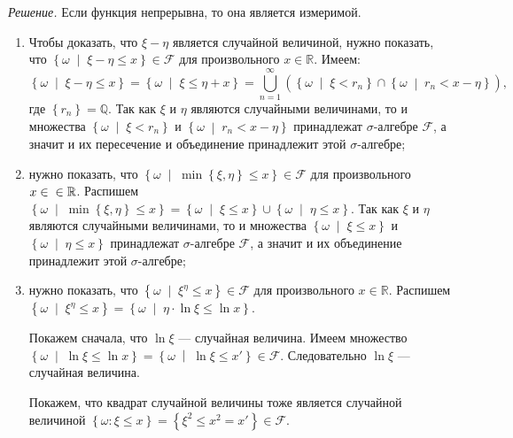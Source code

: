 \textit{Решение.} Если функция непрерывна, то она является измеримой.

\begin{enumerate}[label=\alph*)]
\item
Чтобы доказать, что $ \xi - \eta $ является случайной величиной,
нужно показать, что $ \left\{ \omega \; \middle| \; \xi - \eta \leq x \right\} \in \mathcal{F} $ для произвольного $x \in \mathbb{R} $.
Имеем:
$$ \left\{ \omega \; \middle| \; \xi - \eta \leq x \right\} =
\left\{ \omega \; \middle| \; \xi \leq \eta + x \right\} =
\bigcup \limits_{n=1}^{ \infty } \left( \left\{ \omega \; \middle| \; \xi < r_n \right\} \cap
\left\{ \omega \; \middle| \; r_n < x - \eta \right\} \right),$$
где $ \left\{ r_n \right\} = \mathbb{Q} $.
Так как $ \xi $ и $ \eta $ являются случайными величинами,
то и множества
$ \left\{ \omega \; \middle| \; \xi < r_n \right\} $
и $ \left\{ \omega \; \middle| \; r_n < x - \eta \right\} $ принадлежат $ \sigma $-алгебре $ \mathcal{F} $,
а значит и их пересечение и объединение принадлежит этой $ \sigma $-алгебре;
\item нужно показать, что $ \left\{ \omega \; \middle| \; \min \left\{ \xi, \eta \right\} \leq x \right\} \in \mathcal{F} $ для произвольного $x \in \\
\in \mathbb{R} $.
Распишем
$ \left\{ \omega \; \middle| \; \min \left\{ \xi, \eta \right\} \leq x \right\} =
\left\{ \omega \; \middle| \; \xi \leq x \right\} \cup \left\{ \omega \; \middle| \; \eta \leq x \right\} $.
Так как $ \xi $ и $ \eta $ являются случайными величинами,
то и множества $ \left\{ \omega \; \middle| \; \xi \leq x \right\} $ и $ \left\{ \omega \; \middle| \; \eta \leq x \right\} $ принадлежат $ \sigma $-алгебре $ \mathcal{F} $, а значит и их объединение принадлежит этой $ \sigma $-алгебре;
\item нужно показать, что $ \left\{ \omega \; \middle| \; \xi^{ \eta } \leq x \right\} \in \mathcal{F} $ для произвольного $x \in \mathbb{R} $.
Распишем $ \left\{ \omega \; \middle| \; \xi^{ \eta } \leq x \right\} = \left\{ \omega \; \middle| \; \eta \cdot \ln \xi \leq \ln x \right\} $.

Покажем сначала, что $ \ln \xi $ --- случайная величина.
Имеем множество
$ \left\{ \omega \; \middle| \; \ln \xi \leq \ln x \right\} =
\left\{ \omega \; \middle| \; \ln \xi \leq x' \right\} \in
\mathcal{F} $.
Следовательно $ \ln \xi $ --- случайная величина.

Покажем, что квадрат случайной величины тоже является случайной величиной
$ \left\{ \omega: \xi \leq x \right\} =
\left\{ \xi^2 \leq x^2 = x' \right\} \in
\mathcal{F} $.


\end{enumerate}
